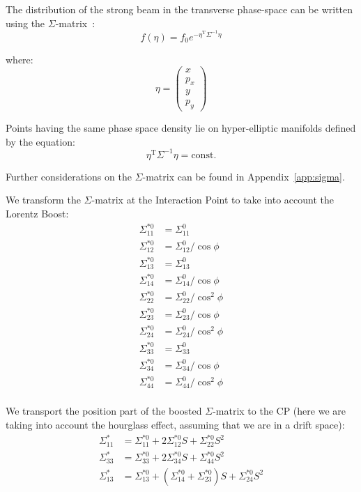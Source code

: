 The distribution of the strong beam in the transverse phase-space can be written using the $\Sigma$-matrix~\cite{wolski2014beam}:
\begin{equation}
f(\eta) = f_0 e^{{-\eta}^{\mathrm{T}} \Sigma^{-1}\eta}
\end{equation}

where:
\begin{equation}
\eta = \left(
\begin{matrix}
x\\
p_x\\
y\\
p_y
\end{matrix}
\right)
\end{equation}

Points having the same phase space density lie on hyper-elliptic manifolds defined by the equation:
\begin{equation}
\eta^\mathrm{T}\Sigma^{-1}\eta = \mathrm{const.}
\label{eqellipse}
\end{equation}

Further considerations on the $\Sigma$-matrix can be found in Appendix~\ref{app:sigma}.

We transform the $\Sigma$-matrix at the Interaction Point to take into account the Lorentz Boost:
\begin{align}
\Sigma^{*0}_{11} &= \Sigma_{11} ^0\\
\Sigma^{*0}_{12} &= \Sigma_{12} ^0/\cos \phi\\
\Sigma^{*0}_{13} &= \Sigma_{13} ^0\\
\Sigma^{*0}_{14} &= \Sigma_{14} ^0/\cos \phi\\
\Sigma^{*0}_{22} &= \Sigma_{22} ^0/\cos^2 \phi\\
\Sigma^{*0}_{23} &= \Sigma_{23} ^0/\cos \phi\\
\Sigma^{*0}_{24} &= \Sigma_{24} ^0/\cos^2 \phi\\
\Sigma^{*0}_{33} &= \Sigma_{33} ^0\\
\Sigma^{*0}_{34} &= \Sigma_{34} ^0/\cos \phi\\
\Sigma^{*0}_{44} &= \Sigma_{44} ^0/\cos^2 \phi\\
\end{align}

We transport the position part of the boosted $\Sigma$-matrix to the CP (here we are taking into account the hourglass effect, assuming that we are in a drift space):
\begin{align}
\Sigma^*_{11} &= \Sigma_{11} ^{*0}+2 \Sigma_{12} ^{*0} S+\Sigma_{22} ^{*0} S^2 \label{eq:TranspSig11}\\
\Sigma^*_{33} &= \Sigma_{33} ^{*0}+2 \Sigma_{34} ^{*0} S +\Sigma_{44} ^{*0} S^2\label{eq:TranspSig33}\\
\Sigma^*_{13} &= \Sigma_{13} ^{*0}+\left(\Sigma_{14} ^{*0} +\Sigma_{23}^{*0}\right) S +\Sigma_{24} ^{*0} S^2\label{eq:TranspSig13}
\end{align}

